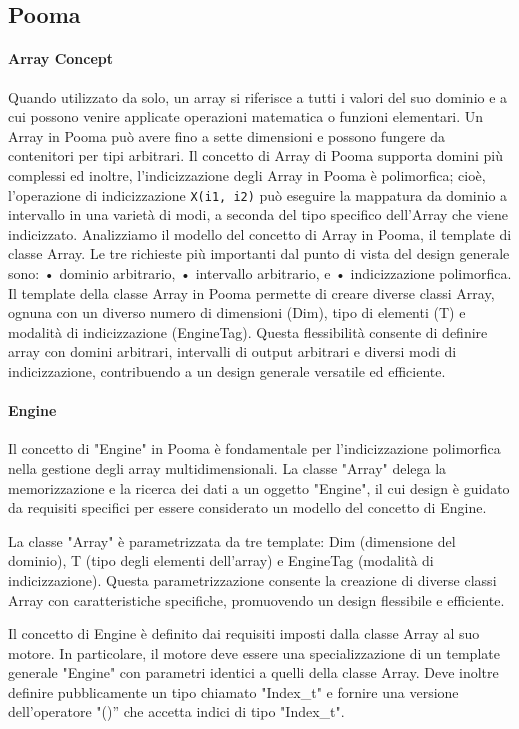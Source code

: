 \documentclass[11pt]{article}
\begin{document}
\begin{multicols*}{2}[\columnsep=1cm]
    \subsection{Pooma}
    \paragraph{Array Concept}
    Quando utilizzato da solo, un array si riferisce a tutti i valori del suo dominio e a cui possono venire applicate operazioni matematica o funzioni elementari.
    Un Array in Pooma può avere fino a sette dimensioni e possono fungere da contenitori per tipi arbitrari. 
    Il concetto di Array di Pooma supporta domini più complessi ed inoltre, l'indicizzazione degli Array in Pooma è polimorfica; cioè, l'operazione di indicizzazione \texttt{X(i1, i2)} può eseguire la mappatura da dominio a intervallo in una varietà di modi, a seconda del tipo specifico dell'Array che viene indicizzato.
    Analizziamo il modello del concetto di Array in Pooma, il template di classe Array.
    Le tre richieste più importanti dal punto di vista del design generale sono:
    • dominio arbitrario,
    • intervallo arbitrario, e
    • indicizzazione polimorfica.
    Il template della classe Array in Pooma permette di creare diverse classi Array, ognuna con un diverso numero di dimensioni (Dim), tipo di elementi (T) e modalità di indicizzazione (EngineTag). Questa flessibilità consente di definire array con domini arbitrari, intervalli di output arbitrari e diversi modi di indicizzazione, contribuendo a un design generale versatile ed efficiente.
    
    \paragraph{Engine}
    Il concetto di "Engine" in Pooma è fondamentale per l'indicizzazione polimorfica nella gestione degli array multidimensionali. La classe "Array" delega la memorizzazione e la ricerca dei dati a un oggetto "Engine", il cui design è guidato da requisiti specifici per essere considerato un modello del concetto di Engine.

    La classe "Array" è parametrizzata da tre template: Dim (dimensione del dominio), T (tipo degli elementi dell'array) e EngineTag (modalità di indicizzazione). Questa parametrizzazione consente la creazione di diverse classi Array con caratteristiche specifiche, promuovendo un design flessibile e efficiente.

    Il concetto di Engine è definito dai requisiti imposti dalla classe Array al suo motore. In particolare, il motore deve essere una specializzazione di un template generale "Engine" con parametri identici a quelli della classe Array. Deve inoltre definire pubblicamente un tipo chiamato "Index\_t" e fornire una versione dell'operatore "()” che accetta indici di tipo "Index\_t".


\end{multicols*}
\end{document}
